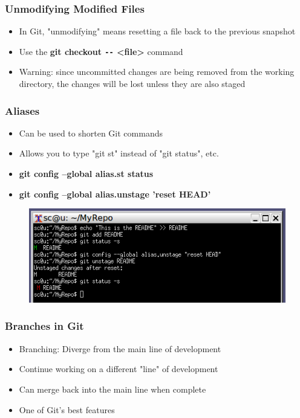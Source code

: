 \documentclass{beamer}
\begin{document}
\begin{frame}
	\frametitle{Unmodifying Modified Files}
	\begin{itemize}
		\item{In Git, "unmodifying" means resetting a file back to the previous snapshot}
		\item{Use the \textbf{git checkout \texttt{-{}-} \textless{}file\textgreater{}} command}
		\item{Warning: since uncommitted changes are being removed from the working directory, the changes will be lost unless they are also staged}
	\end{itemize}
\end{frame}

\begin{frame}
	\frametitle{Aliases}
	\begin{itemize}
		\item{Can be used to shorten Git commands}
		\item{Allows you to type "git st" instead of "git status", etc.}
		\item{\textbf{git config --global alias.st status}}
		\item{\textbf{git config --global alias.unstage 'reset HEAD'}}
	\end{itemize}
	\begin{figure}
		\includegraphics[scale=0.62]{Aliases-0.png}
	\end{figure}
\end{frame}


\begin{frame}
	\frametitle{Branches in Git}
	\begin{itemize}
		\item{Branching: Diverge from the main line of development}
		\item{Continue working on a different "line" of development}
		\item{Can merge back into the main line when complete}
		\item{One of Git's best features}
	\end{itemize}
\end{frame}
\end{document}
